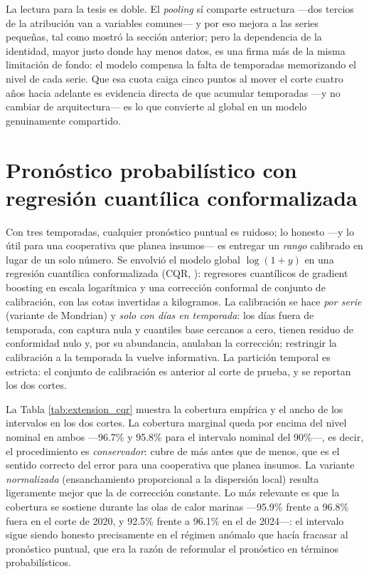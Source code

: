 La lectura para la tesis es doble. El \emph{pooling} sí comparte estructura ---dos tercios de la atribución van a variables comunes--- y por eso mejora a las series pequeñas, tal como mostró la sección anterior; pero la dependencia de la identidad, mayor justo donde hay menos datos, es una firma más de la misma limitación de fondo: el modelo compensa la falta de temporadas memorizando el nivel de cada serie. Que esa cuota caiga cinco puntos al mover el corte cuatro años hacia adelante es evidencia directa de que acumular temporadas ---y no cambiar de arquitectura--- es lo que convierte al global en un modelo genuinamente compartido.

\section{Pronóstico probabilístico con regresión cuantílica conformalizada}
\label{sec:res_cqr}
Con tres temporadas, cualquier pronóstico puntual es ruidoso; lo honesto ---y lo útil para una cooperativa que planea insumos--- es entregar un \emph{rango} calibrado en lugar de un solo número. Se envolvió el modelo global $\log(1+y)$ en una regresión cuantílica conformalizada (CQR, \citealp{romano2019}): regresores cuantílicos de gradient boosting en escala logarítmica y una corrección conformal de conjunto de calibración, con las cotas invertidas a kilogramos. La calibración se hace \emph{por serie} (variante de Mondrian) y \emph{solo con días en temporada}: los días fuera de temporada, con captura nula y cuantiles base cercanos a cero, tienen residuo de conformidad nulo y, por su abundancia, anulaban la corrección; restringir la calibración a la temporada la vuelve informativa. La partición temporal es estricta: el conjunto de calibración es anterior al corte de prueba, y se reportan los dos cortes.

La Tabla \ref{tab:extension_cqr} muestra la cobertura empírica y el ancho de los intervalos en
los dos cortes. La cobertura marginal queda por encima del nivel nominal en ambos ---96.7\% y
95.8\% para el intervalo nominal del 90\%---, es decir, el procedimiento es \emph{conservador}:
cubre de más antes que de menos, que es el sentido correcto del error para una cooperativa que
planea insumos. La variante \emph{normalizada} (ensanchamiento proporcional a la dispersión
local) resulta ligeramente mejor que la de corrección constante. Lo más relevante es que la
cobertura se sostiene durante las olas de calor marinas ---95.9\% frente a 96.8\% fuera en el
corte de 2020, y 92.5\% frente a 96.1\% en el de 2024---: el intervalo sigue siendo honesto
precisamente en el régimen anómalo que hacía fracasar al pronóstico puntual, que era la razón de
reformular el pronóstico en términos probabilísticos.

